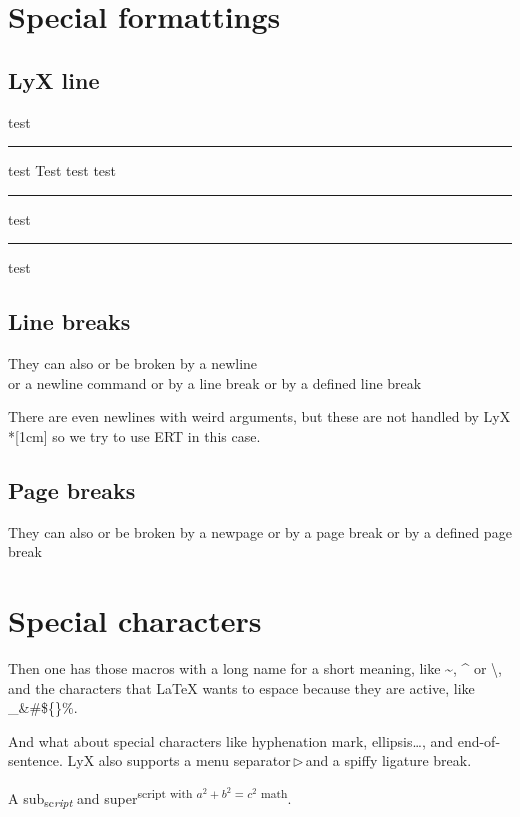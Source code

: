 \documentclass[a4paper,12pt]{article}
\providecommand{\printnomenclature}{\printglossary}
\newcommand{\lyxline}[1][1pt]{%
  \par\noindent%
  \rule[.5ex]{\linewidth}{#1}\par}
\newcommand{\lyxarrow}{\leavevmode\,$\triangleright$\,\allowbreak}
\begin{document}
\section{Special formattings}

\subsection{LyX line}

test

{\tiny \lyxline{\tiny}}{\tiny \par}

test {\Huge Test} {\tiny test} test

\lyxline{\normalsize}

test

{\Huge \lyxline{\Huge}}{\Huge \par}

test

\subsection{Line breaks}

They can also or be broken by a newline\\
or a newline command \newline
or by a line break \linebreak
or by a defined line break \linebreak[4]

There are even newlines with weird arguments, but these are not
handled by LyX\\*[1cm]
so we try to use ERT in this case.

\subsection{Page breaks}

They can also or be broken by a newpage \newpage
or by a page break \pagebreak
or by a defined page break \pagebreak[4]

\section{Special characters}

Then one has those macros with a long name for a short meaning, like
\textasciitilde, \textasciicircum{} or \textbackslash{}, and the characters
that LaTeX wants to espace because they are active, like \_\&\#\$\{\}\%.

And what about special characters like hyphe\-nation mark,
ellipsis\ldots, and end-of-sentence\@. LyX also supports a menu
separator\lyxarrow{}and a spif\textcompwordmark{}fy ligature break.

A sub\textsubscript{sc\emph{ript}} and super\textsuperscript{script
with $a^2+b^2=c^2$ math}.

\printindex{}

\printnomenclature{}
\end{document}
